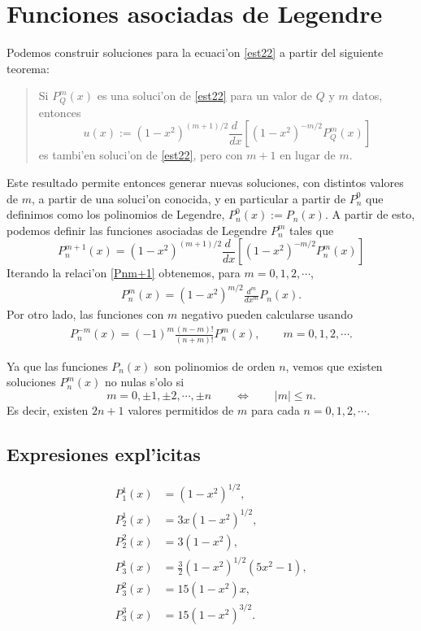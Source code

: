 \section{Funciones asociadas de Legendre}

Podemos construir soluciones para la ecuaci'on \eqref{est22} a partir del siguiente teorema:
\begin{quote}
Si $P_Q^m(x)$ es una soluci'on de \eqref{est22} para un valor de $Q$ y $m$ datos, entonces 
\begin{equation}
u(x):=(1-x^2)^{(m+1)/2}\frac{d\ }{dx}\left[(1-x^2)^{-m/2}P_Q^m(x)\right]
\end{equation}
es tambi'en soluci'on de \eqref{est22}, pero con $m+1$ en lugar de $m$.
\end{quote}
Este resultado permite entonces generar nuevas soluciones, con distintos valores de $m$, a partir de una soluci'on conocida, y en particular a partir de $P_n^0$ que definimos como los polinomios de Legendre, $P_n^0(x):=P_n(x)$. A partir de esto, podemos definir las funciones asociadas de Legendre $P_n^m$ tales que
\begin{equation}\label{Pnm+1}
P_n^{m+1}(x)=(1-x^2)^{(m+1)/2}\frac{d\ }{dx}\left[(1-x^2)^{-m/2}P_n^m(x)\right]
\end{equation}
Iterando la relaci'on \eqref{Pnm+1} obtenemos, para $m=0,1,2,\cdots$, 
\begin{eqnarray}\label{Pnm}
P_n^m(x) =(1-x^2)^{m/2}\frac{d^m}{dx^m} P_n(x).
\end{eqnarray}
Por otro lado, las funciones con $m$ negativo pueden calcularse usando
\begin{eqnarray}
P_n^{-m}(x) = (-1)^m\frac{(n-m)!}{(n+m)!} P_n^m(x), \qquad m=0,1,2,\cdots.
\label{est29}
\end{eqnarray}

Ya que las funciones $P_n(x)$ son polinomios de orden $n$, vemos que existen soluciones $P_n^m(x)$ no nulas s'olo si
\begin{equation}
  m=0,\pm 1,\pm 2,\cdots,\pm n \qquad\Leftrightarrow\qquad
  |m|\leq n.
\end{equation}
Es decir, existen $2n+1$ valores permitidos de $m$ para cada $n=0,1,2,\cdots$.

\subsection{Expresiones expl'icitas}
\begin{align}
P_1^1(x) &= (1-x^2)^{1/2}, \\
P_2^1(x) &= 3x(1-x^2)^{1/2}, \\
P_2^2(x) &= 3(1-x^2), \\
P_3^1(x) &= \frac{3}{2}(1-x^2)^{1/2}(5x^2-1), \\
P_3^2(x) &= 15(1-x^2)x, \\
P_3^3(x) &= 15(1-x^2)^{3/2}. \\
\end{align}


